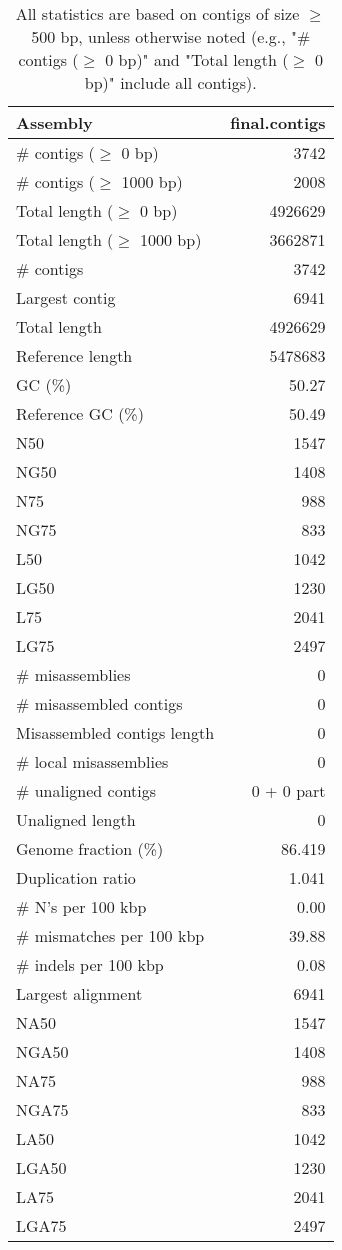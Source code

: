 \documentclass[12pt,a4paper]{article}
\begin{document}
\begin{table}[ht]
\begin{center}
\caption{All statistics are based on contigs of size $\geq$ 500 bp, unless otherwise noted (e.g., "\# contigs ($\geq$ 0 bp)" and "Total length ($\geq$ 0 bp)" include all contigs).}
\begin{tabular}{|l*{1}{|r}|}
\hline
Assembly & final.contigs \\ \hline
\# contigs ($\geq$ 0 bp) & 3742 \\ \hline
\# contigs ($\geq$ 1000 bp) & 2008 \\ \hline
Total length ($\geq$ 0 bp) & 4926629 \\ \hline
Total length ($\geq$ 1000 bp) & 3662871 \\ \hline
\# contigs & 3742 \\ \hline
Largest contig & 6941 \\ \hline
Total length & 4926629 \\ \hline
Reference length & 5478683 \\ \hline
GC (\%) & 50.27 \\ \hline
Reference GC (\%) & 50.49 \\ \hline
N50 & 1547 \\ \hline
NG50 & 1408 \\ \hline
N75 & 988 \\ \hline
NG75 & 833 \\ \hline
L50 & 1042 \\ \hline
LG50 & 1230 \\ \hline
L75 & 2041 \\ \hline
LG75 & 2497 \\ \hline
\# misassemblies & 0 \\ \hline
\# misassembled contigs & 0 \\ \hline
Misassembled contigs length & 0 \\ \hline
\# local misassemblies & 0 \\ \hline
\# unaligned contigs & 0 + 0 part \\ \hline
Unaligned length & 0 \\ \hline
Genome fraction (\%) & 86.419 \\ \hline
Duplication ratio & 1.041 \\ \hline
\# N's per 100 kbp & 0.00 \\ \hline
\# mismatches per 100 kbp & 39.88 \\ \hline
\# indels per 100 kbp & 0.08 \\ \hline
Largest alignment & 6941 \\ \hline
NA50 & 1547 \\ \hline
NGA50 & 1408 \\ \hline
NA75 & 988 \\ \hline
NGA75 & 833 \\ \hline
LA50 & 1042 \\ \hline
LGA50 & 1230 \\ \hline
LA75 & 2041 \\ \hline
LGA75 & 2497 \\ \hline
\end{tabular}
\end{center}
\end{table}
\end{document}
